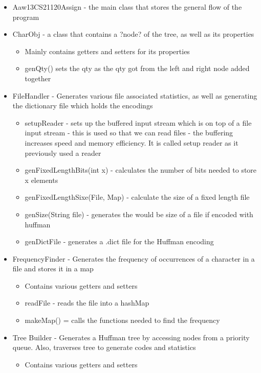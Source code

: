 \documentclass[11pt, oneside]{amsart}
\begin{document}
	\begin{itemize}
		\item Aaw13CS21120Assign - the main class that stores the general flow of the program
		\item CharObj - a class that contains a ?node? of the tree, as well as its properties
		\begin{itemize}
			\item Mainly contains getters and setters for its properties
			\item genQty() sets the qty as the qty got from the left and right node added together
		\end{itemize}
		\item FileHandler - Generates various file associated statistics, as well as generating the dictionary file which holds the encodings
		\begin{itemize}
			\item setupReader - sets up the buffered input stream which is on top of a file input stream - this is used so that we can read files - the buffering increases speed and memory efficiency. It is called setup reader as it previously used a reader
			\item genFixedLengthBits(int x) - calculates the number of bits needed to store x elements
			\item genFixedLengthSixe(File, Map) - calculate the size of a fixed length file
			\item genSize(String file) - generates the would be size of a file if encoded with huffman
			\item genDictFile - generates a .dict file for the Huffman encoding
		\end{itemize}
		\item FrequencyFinder - Generates the frequency of occurrences of a character in a file and stores it in a map
		\begin{itemize}
			\item Contains various getters and setters
			\item readFile - reads the file into a hashMap
			\item makeMap() = calls the functions needed to find the frequency
		\end{itemize}
		\item Tree Builder - Generates a Huffman tree by accessing nodes from a priority queue. Also, traverses tree to generate codes and statistics
		\begin{itemize}
			\item Contains various getters and setters

\end{itemize}
\end{itemize}
\end{document}
